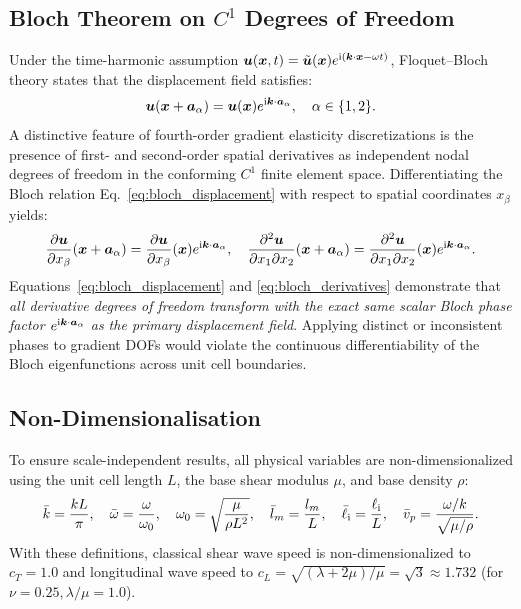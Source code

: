 \subsection{Bloch Theorem on $C^1$ Degrees of Freedom}
Under the time-harmonic assumption $\bm{u}(\bm{x}, t) = \tilde{\bm{u}}(\bm{x})e^{\mathrm{i}(\bm{k}\cdot\bm{x} - \omega t)}$, Floquet--Bloch theory states that the displacement field satisfies:
\begin{equation}
\bm{u}(\bm{x} + \bm{a}_\alpha) = \bm{u}(\bm{x})e^{\mathrm{i} \bm{k} \cdot \bm{a}_\alpha}, \quad \alpha \in \{1, 2\}.
\label{eq:bloch_displacement}
\end{equation}
A distinctive feature of fourth-order gradient elasticity discretizations is the presence of first- and second-order spatial derivatives as independent nodal degrees of freedom in the conforming $C^1$ finite element space. Differentiating the Bloch relation Eq.~\eqref{eq:bloch_displacement} with respect to spatial coordinates $x_\beta$ yields:
\begin{equation}
\frac{\partial \bm{u}}{\partial x_\beta}(\bm{x} + \bm{a}_\alpha) = \frac{\partial \bm{u}}{\partial x_\beta}(\bm{x})e^{\mathrm{i} \bm{k} \cdot \bm{a}_\alpha}, \quad \frac{\partial^2 \bm{u}}{\partial x_1 \partial x_2}(\bm{x} + \bm{a}_\alpha) = \frac{\partial^2 \bm{u}}{\partial x_1 \partial x_2}(\bm{x})e^{\mathrm{i} \bm{k} \cdot \bm{a}_\alpha}.
\label{eq:bloch_derivatives}
\end{equation}
Equations~\eqref{eq:bloch_displacement} and \eqref{eq:bloch_derivatives} demonstrate that \emph{all derivative degrees of freedom transform with the exact same scalar Bloch phase factor $e^{\mathrm{i} \bm{k} \cdot \bm{a}_\alpha}$ as the primary displacement field}. Applying distinct or inconsistent phases to gradient DOFs would violate the continuous differentiability of the Bloch eigenfunctions across unit cell boundaries.

\subsection{Non-Dimensionalisation}
To ensure scale-independent results, all physical variables are non-dimensionalized using the unit cell length $L$, the base shear modulus $\mu$, and base density $\rho$:
\begin{equation}
\bar{k} = \frac{k L}{\pi}, \quad \bar{\omega} = \frac{\omega}{\omega_0}, \quad \omega_0 = \sqrt{\frac{\mu}{\rho L^2}}, \quad \bar{l}_m = \frac{l_m}{L}, \quad \bar{\ell}_{\mathrm{i}} = \frac{\ell_{\mathrm{i}}}{L}, \quad \bar{v}_p = \frac{\omega/k}{\sqrt{\mu/\rho}}.
\label{eq:nondim_defs}
\end{equation}
With these definitions, classical shear wave speed is non-dimensionalized to $c_T = 1.0$ and longitudinal wave speed to $c_L = \sqrt{(\lambda+2\mu)/\mu} = \sqrt{3} \approx 1.732$ (for $\nu = 0.25, \lambda/\mu = 1.0$).

